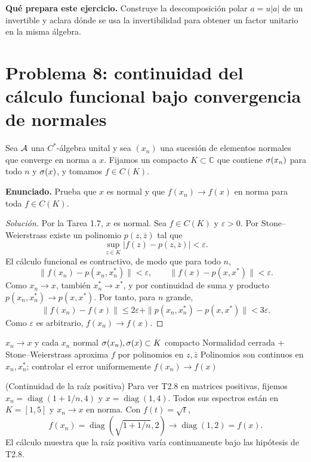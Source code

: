 \noindent\textbf{Qué prepara este ejercicio.} Construye la descomposición polar $a=u|a|$ de un invertible y aclara dónde se usa la invertibilidad para obtener un factor unitario en la misma álgebra.

\section{Problema 8: continuidad del cálculo funcional bajo convergencia de normales}

Sea $\mathcal A$ una $C^*$-álgebra unital y sea $(x_n)$ una sucesión de elementos
normales que converge en norma a $x$. Fijamos un compacto $K\subset\mathbb C$
que contiene $\sigma(x_n)$ para todo $n$ y $\sigma(x)$, y tomamos $f\in C(K)$.

\noindent\textbf{Enunciado.} Prueba que $x$ es normal y que $f(x_n)\to f(x)$ en norma para toda $f\in C(K)$.

\begin{proof}[Solución]
Por la Tarea 1.7, $x$ es normal. Sea $f\in C(K)$ y $\varepsilon>0$. Por Stone--Weierstrass existe
un polinomio $p(z,\overline z)$ tal que
\[
 \sup_{z\in K}|f(z)-p(z,\overline z)|<\varepsilon.
\]
El cálculo funcional es contractivo, de modo que para todo $n$,
\[
\|f(x_n)-p(x_n,x_n^*)\|<\varepsilon,
\qquad
\|f(x)-p(x,x^*)\|<\varepsilon.
\]
Como $x_n\to x$, también $x_n^*\to x^*$, y por continuidad de suma y producto
$p(x_n,x_n^*)\to p(x,x^*)$. Por tanto, para $n$ grande,
\[
\|f(x_n)-f(x)\|
\le 2\varepsilon+\|p(x_n,x_n^*)-p(x,x^*)\|<3\varepsilon.
\]
Como $\varepsilon$ es arbitrario, $f(x_n)\to f(x)$.
\end{proof}

\proofdiagrambranch
{$x_n\to x$ y cada $x_n$ normal}
{$\sigma(x_n),\sigma(x)\subset K$ compacto}
{Normalidad cerrada + Stone--Weierstrass aproxima $f$ por polinomios en $z,\bar z$}
{Polinomios son continuos en $x_n,x_n^*$; controlar el error uniformemente}
{$f(x_n)\to f(x)$}

\begin{cthejemplo}{(Continuidad de la raíz positiva)}
Para ver T2.8 en matrices positivas, fijemos
$x_n=\operatorname{diag}(1+1/n,4)$ y $x=\operatorname{diag}(1,4)$.
Todos sus espectros están en $K=[1,5]$ y $x_n\to x$ en norma.
Con $f(t)=\sqrt t$,
\[
 f(x_n)=\operatorname{diag}(\sqrt{1+1/n},2)
 \longrightarrow\operatorname{diag}(1,2)=f(x).
\]
El cálculo muestra que la raíz positiva varía continuamente bajo las hipótesis de T2.8.
\end{cthejemplo}

